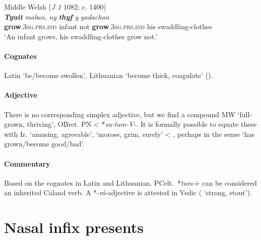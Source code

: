 \documentclass[output=paper,colorlinks,citecolor=brown]{langscibook}
\begin{document}
\begin{exe}
    \ex Middle Welsh (\textit{J 1} 1082; c. 1400)\label{ex:stativethick}\\
        \gll \textit{\textbf{Tyuit}} \textit{maban}, \textit{ny} {\textit{\textbf{thyf}} } \textit{y} \textit{gadachan} \\
        \textbf{grow}.\textsc{3sg.prs.ind} infant not \textbf{grow}.\textsc{3sg.prs.ind} his swaddling-clothes\\
        \glt ‘An infant grows, his swaddling-clothes grow not.’\\
\end{exe}


\paragraph*{Cognates} 

Latin  ‘be/become swollen’, Lithuanian  ‘become thick, coagulate’ ().

\paragraph*{Adjective} 

There is no corresponding simplex adjective, but we find a compound MW  ‘full-grown, thriving’, OBret. PN  < *\textit{su-tum-V}-. It is formally possible to equate these with Ir.  ‘amusing, agreeable’,  ‘morose, grim, surely’ < , perhaps in the sense ‘has grown/become good/bad’.

\paragraph*{Commentary}

Based on the cognates in Latin and Lithuanian, PCelt.\ *\textit{tum-ī}- can be considered an inherited Caland verb.  A *-\textit{ró}-adjective  is attested in Vedic ( ‘strong, stout’).

\section{Nasal infix presents}
\label{sec:CelticNIP}
\end{document}
